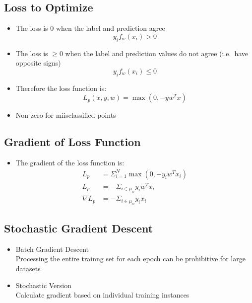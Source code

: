 \documentclass[12pt]{article}
\begin{document}
        \subsection{Loss to Optimize}
            \begin{itemize}
                \item The loss is $0$ when the label and prediction agree
                \begin{equation}
                    y_i{f_w(x_i)} > 0
                \end{equation}
                \item The loss is $\ge 0$ when the label and prediction values do not agree (i.e.\ have opposite signs)
                \begin{equation}
                    y_i{f_w(x_i)} \le 0
                \end{equation}
                \item Therefore the loss function is:
                \begin{equation}
                    L_p(x, y, w) = \max(0, -y{w^T}x)
                \end{equation}
                \item Non-zero for miisclassified points
            \end{itemize}
        \subsection{Gradient of Loss Function}
            \begin{itemize}
                \item The gradient of the loss function is:
                \begin{align*}
                    L_p &= \Sigma_{i=1}^N \max(0, -y_i{w^T}x_i) \\
                    L_p &= -\Sigma_{i \in{}\mu_w} y_i{w^T{x_i}} \\
                    \nabla{}L_p &= -\Sigma_{i \in{}\mu_w} y_i{x_i}
                \end{align*}
            \end{itemize}
        \subsection{Stochastic Gradient Descent}
            \begin{itemize}
                \item Batch Gradient Descent \\
                Processing the entire trainng set for each epoch can be prohibitive for large datasets
                \item Stochastic Version \\
                Calculate gradient based on individual training instances
            \end{itemize}
\end{document}
